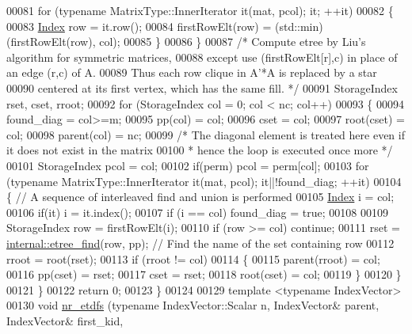 \begin{DoxyCode}
00081     \textcolor{keywordflow}{for} (\textcolor{keyword}{typename} MatrixType::InnerIterator it(mat, pcol); it; ++it)
00082     \{ 
00083       \hyperlink{namespace_eigen_a62e77e0933482dafde8fe197d9a2cfde}{Index} row = it.row();
00084       firstRowElt(row) = (std::min)(firstRowElt(row), col);
00085     \}
00086   \}
00087   \textcolor{comment}{/* Compute etree by Liu's algorithm for symmetric matrices,}
00088 \textcolor{comment}{          except use (firstRowElt[r],c) in place of an edge (r,c) of A.}
00089 \textcolor{comment}{    Thus each row clique in A'*A is replaced by a star}
00090 \textcolor{comment}{    centered at its first vertex, which has the same fill. */}
00091   StorageIndex rset, cset, rroot;
00092   \textcolor{keywordflow}{for} (StorageIndex col = 0; col < nc; col++) 
00093   \{
00094     found\_diag = col>=m;
00095     pp(col) = col; 
00096     cset = col; 
00097     root(cset) = col; 
00098     parent(col) = nc; 
00099     \textcolor{comment}{/* The diagonal element is treated here even if it does not exist in the matrix}
00100 \textcolor{comment}{     * hence the loop is executed once more */} 
00101     StorageIndex pcol = col;
00102     \textcolor{keywordflow}{if}(perm) pcol  = perm[col];
00103     \textcolor{keywordflow}{for} (\textcolor{keyword}{typename} MatrixType::InnerIterator it(mat, pcol); it||!found\_diag; ++it)
00104     \{ \textcolor{comment}{//  A sequence of interleaved find and union is performed }
00105       \hyperlink{namespace_eigen_a62e77e0933482dafde8fe197d9a2cfde}{Index} i = col;
00106       \textcolor{keywordflow}{if}(it) i = it.index();
00107       \textcolor{keywordflow}{if} (i == col) found\_diag = \textcolor{keyword}{true};
00108       
00109       StorageIndex row = firstRowElt(i);
00110       \textcolor{keywordflow}{if} (row >= col) \textcolor{keywordflow}{continue}; 
00111       rset = \hyperlink{namespace_eigen_1_1internal_af1daa938f6414254cc9a754f1ef2490b}{internal::etree\_find}(row, pp); \textcolor{comment}{// Find the name of the set containing row}
00112       rroot = root(rset);
00113       \textcolor{keywordflow}{if} (rroot != col) 
00114       \{
00115         parent(rroot) = col; 
00116         pp(cset) = rset; 
00117         cset = rset; 
00118         root(cset) = col; 
00119       \}
00120     \}
00121   \}
00122   \textcolor{keywordflow}{return} 0;  
00123 \}
00124 
00129 \textcolor{keyword}{template} <\textcolor{keyword}{typename} IndexVector>
00130 \textcolor{keywordtype}{void} \hyperlink{namespace_eigen_1_1internal_acbd726e03f667e0dc788c6b4e92d61ec}{nr\_etdfs} (\textcolor{keyword}{typename} IndexVector::Scalar n, IndexVector& parent, IndexVector& first\_kid, 

\end{DoxyCode}
